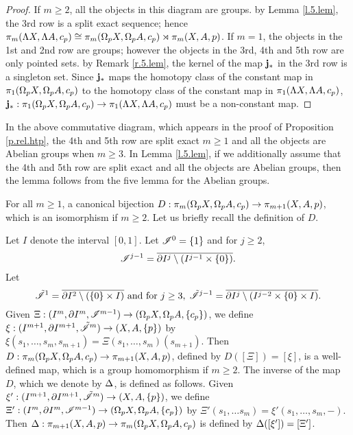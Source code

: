 \documentclass[11pt,twoside]{article}
\begin{document}
\begin{proof}
If \(m\geq 2\), all the objects in this diagram are groups. \tf by Lemma \ref{l.5.lem}, the 3rd row is a split exact sequence; hence \(\pi_m(\Lambda X, \Lambda A, c_p)\cong \pi_m(\Omega_p X, \Omega_p A, c_p)\rtimes \pi_m(X,A, p)\). If \(m=1\), the objects in the 1st and 2nd row are groups; however the objects in the 3rd, 4th and 5th row are only pointed sets. \tf by Remark \ref{r.5.lem}, the kernel of the map \(\mathbf{j}_*\) in the 3rd row is a singleton set. Since \(\mathbf{j}_*\) maps the homotopy class of the constant map in \(\pi_1(\Omega_p X, \Omega_p A, c_p)\) to the homotopy class of the constant map in \(\pi_1(\Lambda X, \Lambda A, c_p)\), \(\mathbf{j}_*:\pi_1(\Omega_p X, \Omega_p A, c_p) \rightarrow \pi_1(\Lambda X, \Lambda A, c_p)\) must be a non-constant map.

\end{proof}
\begin{rmk}
In the above commutative diagram, which appears in the proof of Proposition \ref{p.rel.htp}, the 4th and 5th row are split exact \fa $m\geq 1$ and all the objects are Abelian groups when $m\geq 3$. In Lemma \ref{l.5.lem}, if we additionally assume that the 4th and 5th row are split exact and all the objects are Abelian groups, then the lemma follows from the five lemma for the Abelian groups.
\end{rmk}
\begin{rmk}\label{r.rel.htp}
For all \(m\geq 1\), \tes a canonical bijection \(D:\pi_m(\Omega_pX,\Omega_pA,c_p)\rightarrow\pi_{m+1}(X,A,p)\), which is an isomorphism if \(m\geq 2\). Let us briefly recall the definition of \(D\). 

Let $I$ denote the interval $[0,1]$. Let $\mathscr{I}^0=\{1\}$ and for \(j\geq 2\),
\[\mathscr{I}^{j-1}=\overline{\partial I^j\setminus (I^{j-1}\times \{0\})}.\]
Let
\[\tilde{\mathscr{I}}^1=\overline{\partial I^2\setminus (\{0\}\times I)} \text { and for } j\geq 3,\; \tilde{\mathscr{I}}^{j-1}=\overline{\partial I^j \setminus (I^{j-2}\times\{0\}\times I)}.\]
Given \(\Xi:(I^m,\partial I^m,\mathscr{I}^{m-1})\rightarrow (\Omega_pX,\Omega_pA,\{c_p\})\), we define \(\xi:(I^{m+1},\partial I^{m+1},\tilde{\mathscr{I}}^{m})\rightarrow(X,A,\{p\})\) by \(\xi(s_1,\dots,s_m,s_{m+1})=\Xi(s_1,\dots,s_m)(s_{m+1})\). Then \(D:\pi_m(\Omega_pX,\Omega_pA,c_p)\rightarrow\pi_{m+1}(X,A,p)\), defined by \(D([\Xi])=[\xi]\), is a well-defined map, which is a group homomorphism if \(m\geq 2\). The inverse of the map $D$, which we denote by \(\Delta\), is defined as follows. Given \(\xi':(I^{m+1},\partial I^{m+1},\tilde{\mathscr{I}}^{m})\rightarrow(X,A,\{p\})\), we define \(\Xi':(I^m,\partial I^m,\mathscr{I}^{m-1})\rightarrow (\Omega_pX,\Omega_pA,\{c_p\})\) by \(\Xi'(s_1,\dots s_m)=\xi'(s_1,\dots,s_m,-)\). Then \(\Delta: \pi_{m+1}(X,A,p) \rightarrow \pi_m(\Omega_pX,\Omega_pA,c_p)\) is defined by $\Delta([\xi'])=[\Xi']$.
\end{rmk}
\end{document}
